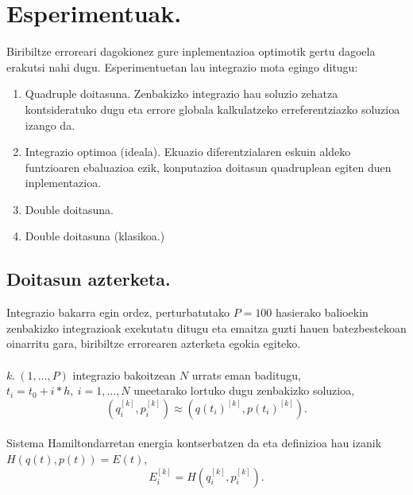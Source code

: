 \section{Esperimentuak.}

Biribiltze erroreari dagokionez gure inplementazioa optimotik gertu dagoela erakutsi nahi dugu. Esperimentuetan lau integrazio mota egingo ditugu:

\begin{enumerate}

\item Quadruple doitasuna. Zenbakizko integrazio hau soluzio zehatza kontsideratuko dugu eta errore globala kalkulatzeko erreferentziazko soluzioa izango da.

\item Integrazio optimoa (ideala). Ekuazio diferentzialaren eskuin aldeko funtzioaren ebaluazioa ezik, konputazioa doitasun quadruplean  egiten duen inplementazioa. 

\item Double doitasuna.

\item Double doitasuna (klasikoa.)

\end{enumerate}

\subsection{Doitasun azterketa.}

Integrazio bakarra egin ordez, perturbatutako $P=100$ hasierako balioekin zenbakizko integrazioak exekutatu ditugu eta emaitza guzti hauen batezbestekoan oinarritu gara, biribiltze errorearen azterketa egokia egiteko.    

\paragraph*{}  $ k. \ (1,\dots,P)$ integrazio bakoitzean $N$ urrats eman baditugu, $t_i=t_0+i*h, \ i=1,\dots,N$ uneetarako lortuko dugu 
zenbakizko soluzioa,
\begin{equation*}
(q_i^{[k]},p_i^{[k]})\approx(q(t_i)^{[k]},p(t_i)^{[k]}).
\end{equation*}

\paragraph*{}Sistema Hamiltondarretan energia kontserbatzen da eta  definizioa hau izanik $H(q(t),p(t))=E(t)$,
\begin{equation*}
E_i^{[k]}=H(q_i^{[k]},p_i^{[k]}).
\end{equation*}


